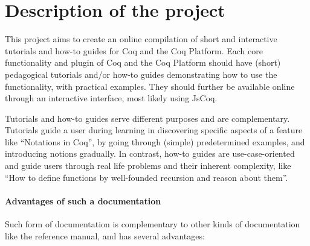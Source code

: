 \documentclass{easychair}
\begin{document}
\section{Description of the project}

This project aims to create an online compilation of short and interactive
tutorials and how-to guides for Coq and the Coq Platform.
Each core functionality and plugin of Coq and the Coq Platform should have
(short) pedagogical tutorials and/or how-to guides demonstrating how to use the
functionality, with practical examples. They should further be available online
through an interactive interface, most likely using JsCoq.

Tutorials and how-to guides serve different purposes and are complementary.
Tutorials guide a user during learning in discovering specific aspects of a
feature like ``Notations in Coq'', by going through (simple) predetermined
examples, and introducing notions gradually. In contrast, how-to guides are
use-case-oriented and guide users through real life problems and their inherent
complexity, like ``How to define functions by well-founded recursion and reason
about them''.

\paragraph{Advantages of such a documentation}

Such form of documentation is complementary to other kinds of documentation like
the reference manual, and has several advantages:
\end{document}
